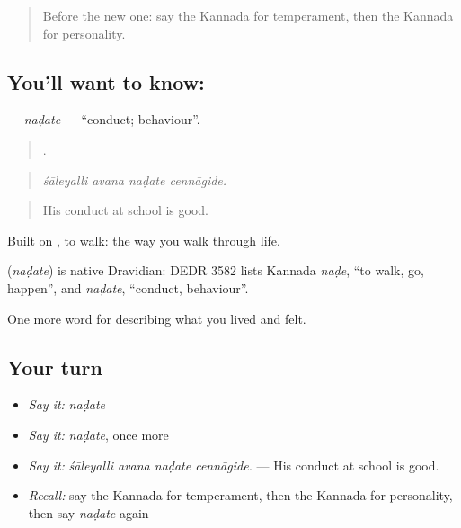\label{lesson:KA-C500-nadate}



\begin{quote}
Before the new one: say the Kannada for temperament, then the Kannada for personality.
\end{quote}

\subsection*{You'll want to know: }
\textbf{} — \emph{naḍate} — \textquotedblleft{}conduct; behaviour\textquotedblright{}.

\begin{quote}
   .
\end{quote}

\begin{quote}
\emph{śāleyalli avana naḍate cennāgide.}
\end{quote}

\begin{quote}
His conduct at school is good.
\end{quote}

Built on , to walk: the way you walk through life.

\begin{cousinweb}
\textbf{} (\emph{naḍate}) is native Dravidian: DEDR 3582 lists Kannada \emph{naḍe}, \textquotedblleft{}to walk, go, happen\textquotedblright{}, and \emph{naḍate}, \textquotedblleft{}conduct, behaviour\textquotedblright{}.
\end{cousinweb}

\begin{grammarlens}[title={What you've built}]
One more word for describing what you lived and felt.
\end{grammarlens}

\subsection*{Your turn}
\begin{itemize}
\raggedright
  \item \emph{Say it:} \emph{naḍate}
  \item \emph{Say it:} \emph{naḍate}, once more
  \item \emph{Say it:} \emph{śāleyalli avana naḍate cennāgide.} — His conduct at school is good.
  \item \emph{Recall:} say the Kannada for temperament, then the Kannada for personality, then say \emph{naḍate} again
\end{itemize}

